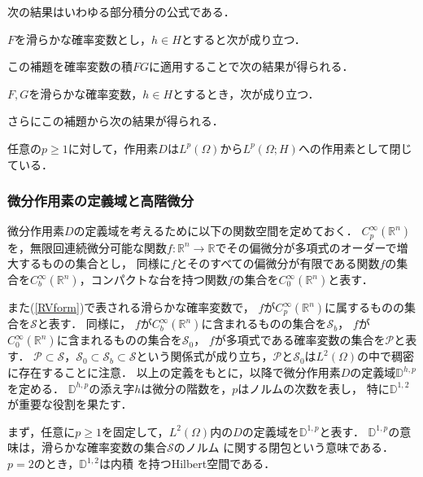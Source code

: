 次の結果はいわゆる部分積分の公式である．
\begin{lemma}\label{lem1.2.1}%
$F$を滑らかな確率変数とし，$h\in H$とすると次が成り立つ．
\end{lemma}
この補題を確率変数の積$FG$に適用することで次の結果が得られる．
\begin{lemma}\label{lem1.2.2}%
$F,G$を滑らかな確率変数，$h\in H$とするとき，次が成り立つ．
\end{lemma}
さらにこの補題から次の結果が得られる．
\begin{proposition}\label{prop1.2.1}%
任意の$p\ge1$に対して，作用素$D$は$L^p(\Omega)$から$L^p(\Omega;H)$への作用素として閉じている．
\end{proposition}

\subsubsection{微分作用素の定義域と高階微分}
微分作用素$D$の定義域を考えるために以下の関数空間を定めておく．
$C_p^\infty(\mathbb{R}^n)$を，無限回連続微分可能な関数$f:\mathbb{R}^n\rightarrow\mathbb{R}$でその偏微分が多項式のオーダーで増大するものの集合とし，
同様に$f$とそのすべての偏微分が有限である関数$f$の集合を$C^\infty_b(\mathbb{R}^n)$，コンパクトな台を持つ関数$f$の集合を$C^\infty_0(\mathbb{R}^n)$と表す．

また(\ref{RVform})で表される滑らかな確率変数で，
$f$が$C_p^\infty(\mathbb{R}^n)$に属するものの集合を$\mathcal{S}$と表す．
同様に，
$f$が$C_b^\infty(\mathbb{R}^n)$に含まれるものの集合を$\mathcal{S}_b$，
$f$が$C_0^\infty(\mathbb{R}^n)$に含まれるものの集合を$\mathcal{S}_0$，
$f$が多項式である確率変数の集合を$\mathcal{P}$と表す．
$\mathcal{P}\subset\mathcal{S}$，$\mathcal{S}_0\subset\mathcal{S}_b\subset\mathcal{S}$という関係式が成り立ち，$\mathcal{P}$と$\mathcal{S}_0$は$L^2(\Omega)$の中で稠密に存在することに注意．
以上の定義をもとに，以降で微分作用素$D$の定義域$\mathbb{D}^{h,p}$を定める．
$\mathbb{D}^{h,p}$の添え字$h$は微分の階数を，$p$はノルムの次数を表し，
特に$\mathbb{D}^{1,2}$が重要な役割を果たす．

まず，任意に$p\ge1$を固定して，$L^2(\Omega)$内の$D$の定義域を$\mathbb{D}^{1,p}$と表す．
$\mathbb{D}^{1,p}$の意味は，滑らかな確率変数の集合$\mathcal{S}$のノルム
に関する閉包という意味である．
$p=2$のとき，$\mathbb{D}^{1,2}$は内積
を持つHilbert空間である．

